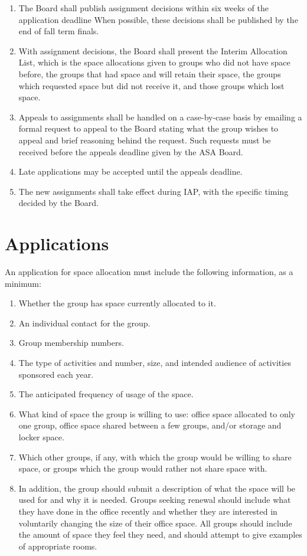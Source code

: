 \documentclass[12pt]{article}
\begin{document}
\begin{enumerate}
    \item The Board shall publish assignment decisions within six weeks of the application deadline
When possible, these decisions shall be published by the end of fall term finals.

    \item With assignment decisions, the Board shall present the Interim Allocation List, which is the
space allocations given to groups who did not have space before, the groups that had
space and will retain their space, the groups which requested space but did not receive it,
and those groups which lost space.
    \item Appeals to assignments shall be handled on a case-by-case basis by emailing a formal request
to appeal to the Board stating what the group wishes to appeal and brief reasoning behind
the request. Such requests must be received before the appeals deadline given by the ASA
Board.
    \item Late applications may be accepted until the appeals deadline.
    \item The new assignments shall take effect during IAP, with the specific timing decided by the Board.
\end{enumerate}

\section{Applications}
\label{art:VII_sect4}
An application for space allocation must include the following information, as a minimum:
\begin{enumerate}
    \item Whether the group has space currently allocated to it.
    \item An individual contact for the group.
    \item Group membership numbers.
    \item The type of activities and number, size, and intended audience of activities sponsored each
year.
    \item The anticipated frequency of usage of the space.
    \item What kind of space the group is willing to use: office space allocated to only one group,
office space shared between a few groups, and/or storage and locker space.
    \item Which other groups, if any, with which the group would be willing to share space, or
groups which the group would rather not share space with.
    \item In addition, the group should submit a description of what the space will be used for and why
it is needed. Groups seeking renewal should include what they have done in the office
recently and whether they are interested in voluntarily changing the size of their office space.
All groups should include the amount of space they feel they need, and should attempt to
give examples of appropriate rooms.
\end{enumerate}
\end{document}
